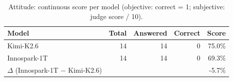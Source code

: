 \begin{table}[H]
  \centering
  \begin{tabular}{l r r r r}
    \toprule
    \textbf{Model} & \textbf{Total} & \textbf{Answered} & \textbf{Correct} & \textbf{Score} \\
    \midrule
    Kimi-K2.6 & 14 & 14 & 0 & 75.0\% \\
    Innospark-1T & 14 & 14 & 0 & 69.3\% \\
    \midrule
    $\Delta$ (Innospark-1T $-$ Kimi-K2.6) & & & & -5.7\% \\
    \bottomrule
  \end{tabular}
  \caption{Attitude: continuous score per model (objective: correct = 1; subjective: judge score / 10).}
  \label{tab:cat_attitude}
\end{table}